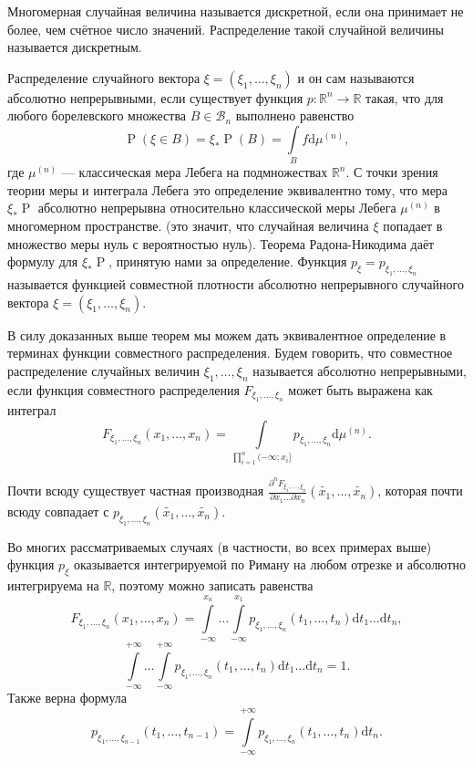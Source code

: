 \documentclass[12pt]{article}
\numberwithin{theorem}{section}
\theoremstyle{definition}
\newcommand{\defin}[2]{\hypertarget{#2}{{\color{red} #1}}}
\newcommand{\RR}{\mathbb{R}}
\newcommand{\calB}{\mathcal{B}}
\newcommand{\prob}{\operatorname{P}}
\newcommand{\diff}{\mathrm{d}}
\begin{document}
	Многомерная случайная величина называется \defin{дискретной}{joint-discrete},
	если она принимает не более, чем счётное число значений.
	Распределение такой случайной величины называется \defin{дискретным}{joint-discrete-distribution-function}.
	
	Распределение случайного вектора $ \xi = (\xi_1,\ldots,\xi_n) $ 
	и он сам называются \defin{абсолютно непрерывными}{joint-absolutely-continuous},
	если существует функция $ p \colon \mathbb{R}^n \to \mathbb{R} $ такая, что
	для любого борелевского множества $ B \in \calB_n $ выполнено равенство
	$$ \prob(\xi \in B) = \xi_*\prob(B) = \int\limits_{B} f\diff\mu^{(n)}, $$
	где $ \mu^{(n)} $ --- классическая мера Лебега на подмножествах $ \RR^n $.
	С точки зрения теории меры и интеграла Лебега это определение эквивалентно тому,
	что мера $ \xi_*\prob $ абсолютно непрерывна относительно классической меры Лебега $ \mu^{(n)} $
	в многомерном пространстве.
	(это значит, что случайная величина $ \xi $ попадает в множество меры нуль с вероятностью нуль).
	Теорема Радона-Никодима даёт формулу для $ \xi_*\prob $, принятую нами за определение.
	Функция $ p_\xi = p_{\xi_1,\ldots,\xi_n} $ называется \defin{функцией совместной плотности}{joint-probability-density-function}
	абсолютно непрерывного случайного вектора $ \xi = (\xi_1,\ldots,\xi_n) $.
	
	В силу доказанных выше теорем мы можем дать эквивалентное определение в терминах функции совместного распределения.
	Будем говорить, что совместное распределение случайных величин $ \xi_1,\ldots,\xi_n $ называется \defin{абсолютно непрерывными}{joint-absolutely-continuous-2}, 
	если функция совместного распределения $ F_{\xi_1,\ldots,\xi_n} $ может быть выражена как интеграл
	$$ F_{\xi_1,\ldots,\xi_n}(x_1, \ldots, x_n) 
	= \int\limits_{\prod\limits_{i = 1}^{n} (-\infty; x_i]}  p_{\xi_1,\ldots,\xi_n}\diff\mu^{(n)}. $$
	
	Почти всюду существует частная производная $ \tfrac{\partial^n F_{\xi_1,\ldots,\xi_n}}{\partial x_1 \ldots \partial x_n}(\tilde{x_1}, \ldots, \tilde{x_n}) $, 
	которая почти всюду совпадает с $ p_{\xi_1,\ldots,\xi_n}(\tilde{x_1}, \ldots, \tilde{x_n}) $.
	
	Во многих рассматриваемых случаях (в частности, во всех примерах выше) 
	функция $ p_\xi $ оказывается интегрируемой по Риману на любом отрезке
	и абсолютно интегрируема на $ \RR $, поэтому можно записать равенства
	$$ F_{\xi_1,\ldots,\xi_n}(x_1,\ldots,x_n) 
	= \int\limits_{-\infty}^{x_n} \ldots \int\limits_{-\infty}^{x_1} 
	p_{\xi_1,\ldots,\xi_n}(t_1,\ldots,t_n)\diff t_1 \ldots \diff t_n, 
	$$ 
	$$ \int\limits_{-\infty}^{+\infty} \ldots \int\limits_{-\infty}^{+\infty} 
	p_{\xi_1,\ldots,\xi_n}(t_1,\ldots,t_n)\diff t_1 \ldots \diff t_n = 1. $$
	Также верна формула
	$$ p_{\xi_1,\ldots,\xi_{n - 1}}(t_1, \ldots, t_{n - 1}) = \int\limits_{-\infty}^{+\infty}
	p_{\xi_1,\ldots,\xi_n}(t_1,\ldots,t_n)\diff t_n. $$
	
\end{document}
